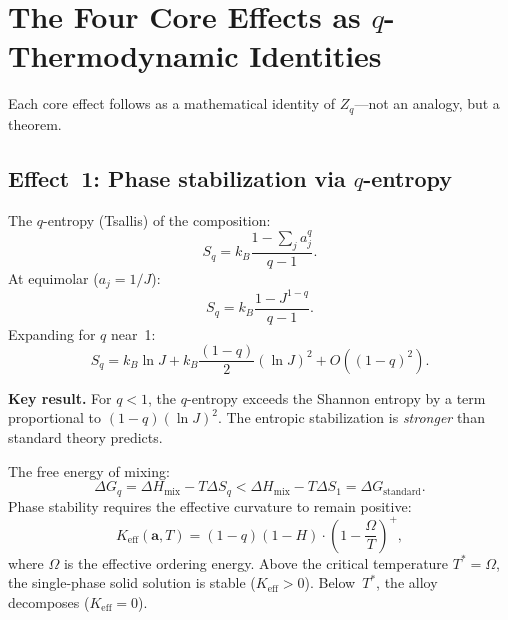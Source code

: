 \documentclass[12pt,letterpaper]{article}
\theoremstyle{definition}
\begin{document}
\section{The Four Core Effects as $q$-Thermodynamic Identities}

Each core effect follows as a mathematical identity of $Z_q$---not an analogy, but a theorem.

\subsection{Effect~1: Phase stabilization via $q$-entropy}

The $q$-entropy (Tsallis) of the composition:
\begin{equation}\label{eq:Sq}
  S_q = k_B \frac{1 - \sum_j a_j^q}{q - 1}.
\end{equation}
At equimolar ($a_j = 1/J$):
\begin{equation}
  S_q = k_B \frac{1 - J^{1-q}}{q - 1}.
\end{equation}
Expanding for $q$ near~1:
\begin{equation}
  S_q = k_B \ln J + k_B \frac{(1-q)}{2}(\ln J)^2 + O((1-q)^2).
\end{equation}

\begin{mdframed}
\textbf{Key result.}  For $q < 1$, the $q$-entropy exceeds the Shannon entropy by a term proportional to $(1-q)(\ln J)^2$.  The entropic stabilization is \emph{stronger} than standard theory predicts.
\end{mdframed}

The free energy of mixing:
\begin{equation}
  \Delta G_q = \Delta H_{\mathrm{mix}} - T \Delta S_q < \Delta H_{\mathrm{mix}} - T \Delta S_1 = \Delta G_{\mathrm{standard}}.
\end{equation}
Phase stability requires the effective curvature to remain positive:
\begin{equation}\label{eq:Keff}
  K_{\mathrm{eff}}(\mathbf{a}, T) = (1-q)(1-H) \cdot \left(1 - \frac{\Omega}{T}\right)^+,
\end{equation}
where $\Omega$ is the effective ordering energy.  Above the critical temperature $T^* = \Omega$, the single-phase solid solution is stable ($K_{\mathrm{eff}} > 0$).  Below~$T^*$, the alloy decomposes ($K_{\mathrm{eff}} = 0$).
\end{document}
